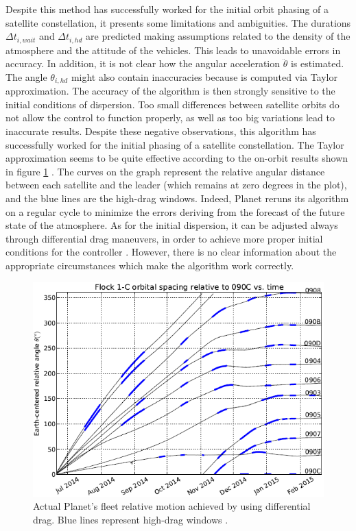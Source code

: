 Despite this method has successfully worked for the initial orbit phasing of a satellite constellation, it presents some limitations and ambiguities.
The durations $\Delta t_{i,wait}$ and $\Delta t_{i,hd}$ are predicted making assumptions related to the density of the atmosphere and the attitude of the vehicles.
This leads to unavoidable errors in accuracy.
In addition, it is not clear how the angular acceleration $\ddot{\theta}$ is estimated.
The angle $\theta_{i,hd}$ might also contain inaccuracies because is computed via Taylor approximation.
The accuracy of the algorithm is then strongly sensitive to the initial conditions of dispersion.
Too small differences between satellite orbits do not allow the control to function properly, as well as too big variations lead to inaccurate results.
Despite these negative observations, this algorithm has successfully worked for the initial phasing of a satellite constellation.
The Taylor approximation seems to be quite effective according to the on-orbit results shown in figure \ref{planet_orbit_results_fig} \cite{lee2017cubesat}.
The curves on the graph represent the relative angular distance between each satellite and the leader (which remains at zero degrees in the plot), and the blue lines are the high-drag windows.  
Indeed, Planet reruns its algorithm on a regular cycle to minimize the errors deriving from the forecast of the future state of the atmosphere.
As for the initial dispersion, it can be adjusted always through differential drag maneuvers, in order to achieve more proper initial conditions for the controller \cite{foster2015orbit}.
However, there is no clear information about the appropriate circumstances which make the algorithm work correctly.

\begin{figure}
      \centering
      \includegraphics[scale=0.7]{img/planet_orbit_results.png}
      \caption{Actual Planet's fleet relative motion achieved by using differential drag. 
      Blue lines represent high-drag windows \cite{foster2015orbit}.}
      \label{planet_orbit_results_fig}
\end{figure}

